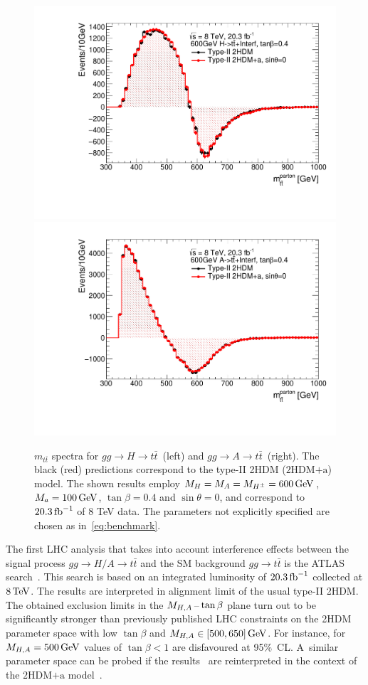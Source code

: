 \documentclass[a4paper, 11pt,notoc]{article}
\newcommand{\mA}{\ensuremath{M_{A}}\xspace}
\newcommand{\ma}{\ensuremath{M_{a}}\xspace}
\newcommand{\mH}{\ensuremath{M_{H}}\xspace}
\newcommand{\mHc}{\ensuremath{M_{H^{\pm}}}\xspace}
\newcommand{\hdma}{\ensuremath{\textrm{2HDM+a}}\xspace}
\begin{document}
\begin{figure}
\centering
\includegraphics[width=.475\textwidth]{ttres_2HDMvs2HDMa_H.pdf} \quad 
\includegraphics[width=.475\textwidth]{ttres_2HDMvs2HDMa_A.pdf}
\vspace{4mm}
\caption{$m_{t \bar t}$ spectra for $gg \to H \to t \bar t$~(left) and  $gg \to A \to t \bar t$~(right). The black (red) predictions correspond to the type-II 2HDM (\hdma) model.  The shown results employ $\mH=\mA=\mHc = 600 \, {\rm GeV}$,  $\ma=100 \, {\rm GeV}$, $\tan \beta =0.4$ and $\sin \theta = 0$, and correspond to $20.3 \, {\rm fb}^{-1}$ of 8 TeV data.  The parameters not explicitly specified are chosen as in~\eqref{eq:benchmark}.}
\label{fig:ttres_2HDMvs2HDMa}
\end{figure}

The first LHC analysis that takes into account interference effects between the signal process $gg \to H/A \to t \bar t$ and the SM background $gg \to t \bar t$ is the ATLAS search~\cite{Aaboud:2017hnm}. This search  is based on an integrated luminosity of $20.3 \, {\rm fb}^{-1}$ collected at $8 \, {\rm TeV}$. The results are interpreted in alignment limit of the usual type-II 2HDM. The obtained  exclusion limits in the $M_{H,A}\hspace{0.5mm}$--$\hspace{0.5mm} \tan \beta$ plane turn out to be significantly stronger than previously published LHC constraints on the 2HDM parameter space with low $\tan \beta$ and $M_{H,A} \in [500, 650] \, {\rm GeV}$. For instance,  for $M_{H,A} = 500 \, {\rm GeV}$ values of $\tan \beta < 1$ are disfavoured at 95\%~CL. A~similar parameter space  can be probed if the results~\cite{Aaboud:2017hnm} are reinterpreted in the context of the \hdma model~\cite{Bauer:2017ota}. 
\end{document}
